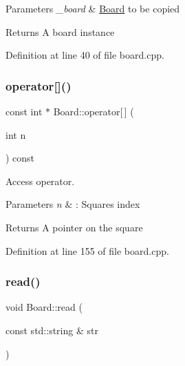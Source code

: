 \begin{DoxyParams}{Parameters}
{\em \+\_\+board} & \hyperlink{class_board}{Board} to be copied\\
\hline
\end{DoxyParams}
\begin{DoxyReturn}{Returns}
A board instance 
\end{DoxyReturn}


Definition at line 40 of file board.\+cpp.

\hypertarget{class_board_a92d07d150ac4f9c341fd18168d86072c}{}\label{class_board_a92d07d150ac4f9c341fd18168d86072c} 
\subsubsection{\texorpdfstring{operator[]()}{operator[]()}}
{\footnotesize\ttfamily const int $\ast$ Board\+::operator\mbox{[}$\,$\mbox{]} (\begin{DoxyParamCaption}\item[{int}]{n }\end{DoxyParamCaption}) const}



Access operator. 


\begin{DoxyParams}{Parameters}
{\em n} & \+: Square\textquotesingle{}s index\\
\hline
\end{DoxyParams}
\begin{DoxyReturn}{Returns}
A pointer on the square 
\end{DoxyReturn}


Definition at line 155 of file board.\+cpp.

\hypertarget{class_board_a32cb3d0839fd2abceb1ffcba270ae4fd}{}\label{class_board_a32cb3d0839fd2abceb1ffcba270ae4fd} 
\subsubsection{\texorpdfstring{read()}{read()}}
{\footnotesize\ttfamily void Board\+::read (\begin{DoxyParamCaption}\item[{const std\+::string \&}]{str }\end{DoxyParamCaption})}



